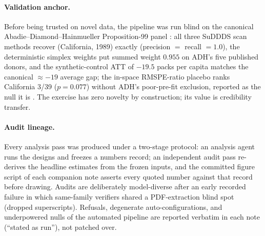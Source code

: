 \documentclass[11pt]{article}
\begin{document}
\paragraph{Validation anchor.} Before being trusted on novel data, the
pipeline was run blind on the canonical Abadie--Diamond--Hainmueller
Proposition-99 panel \cite{abadie2010}: all three SuDDDS scan methods
recover (California, 1989) exactly (precision $=$ recall $=1.0$), the
deterministic simplex weights put summed weight $0.955$ on ADH's five
published donors, and the synthetic-control ATT of $-19.5$ packs per capita
matches the canonical $\approx -19$ average gap; the in-space RMSPE-ratio
placebo ranks California 3/39 ($p=0.077$) without ADH's poor-pre-fit
exclusion, reported as the null it is \cite{noteprop99}. The exercise has
zero novelty by construction; its value is credibility transfer.

\paragraph{Audit lineage.} Every analysis pass was produced under a
two-stage protocol: an analysis agent runs the designs and freezes a numbers
record; an independent audit pass re-derives the headline estimates from the
frozen inputs, and the committed figure script of each companion note
asserts every quoted number against that record before drawing. Audits are
deliberately model-diverse after an early recorded failure in which
same-family verifiers shared a PDF-extraction blind spot (dropped
superscripts). Refusals, degenerate auto-configurations, and underpowered
nulls of the automated pipeline are reported verbatim in each note
(``stated as run''), not patched over.
\end{document}
